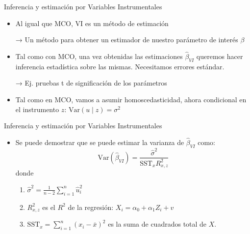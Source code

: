\documentclass[10pt]{beamer}
\begin{document}
\begin{frame}{Inferencia y estimación por Variables Instrumentales}
\begin{itemize}
    \item Al igual que MCO, VI es un método de estimación
    \begin{itemize}
        \newline → Un método para obtener un estimador de nuestro parámetro de interés $\beta$
    \end{itemize}
    \item Tal como con MCO, una vez obtenidas las estimaciones \(\hat{\beta}_{VI}\) queremos hacer inferencia estadística sobre las mismas. Necesitamos errores estándar.
    \begin{itemize}
        \newline →  Ej. pruebas t de significación de los parámetros
    \end{itemize}
    \item Tal como en MCO, vamos a asumir homoscedasticidad, ahora condicional en el instrumento \(z\): \( \text{Var}(u \mid z) = \sigma^2 \)
\end{itemize}
\end{frame}
\begin{frame}{Inferencia y estimación por Variables Instrumentales}
\begin{itemize}
    \item Se puede demostrar que se puede estimar la varianza de \(\hat{\beta}_{VI}\) como:
    \[
    \text{Var}(\hat{\beta}_{VI}) = \frac{\hat{\sigma}^2}{\text{SST}_x R^2_{x,z}}
    \]
    donde
    \begin{enumerate}
        \item \(\hat{\sigma}^2 = \frac{1}{n-2} \sum_{i=1}^{n} \hat{u}_i^2\)
        \item \(R^2_{x,z}\) es el \(R^2\) de la regresión: \(X_i = \alpha_0 + \alpha_1 Z_i + v\)
        \item \(\text{SST}_x = \sum_{i=1}^{n} (x_i - \bar{x})^2\) es la suma de cuadrados total de \(X\).
    \end{enumerate}
\end{itemize}
\end{frame}
\end{document}

